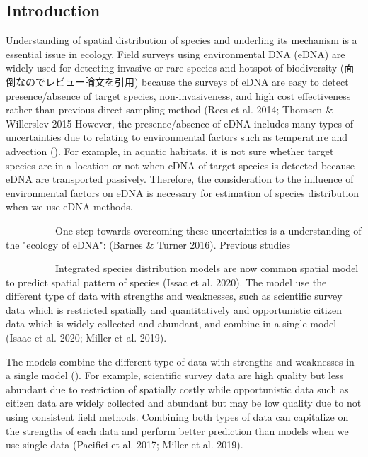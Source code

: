 \documentclass[12pt]{article}
\begin{document}
\newpage
\begin{linenumbers}
\section{Introduction}
Understanding of spatial distribution of species and underling its mechanism is a essential issue in ecology.
Field surveys using environmental DNA (eDNA) are widely used for detecting invasive or rare species and hotspot of biodiversity (面倒なのでレビュー論文を引用) because the surveys of eDNA are easy to detect presence/absence of target species, non-invasiveness, and high cost effectiveness rather than previous direct sampling method (Rees et al. 2014; Thomsen \& Willerslev 2015 %
However, the presence/absence of eDNA includes many types of uncertainties due to relating to environmental factors such as temperature and advection ().
For example, in aquatic habitats, it is not sure whether target species are in a location or not when eDNA of target species is detected because eDNA are transported passively.
Therefore, the consideration to the influence of environmental factors on eDNA is necessary for estimation of species distribution when we use eDNA methods.

\ \ \ \ \ \ \ \ \ \ 
One step towards overcoming these uncertainties is a understanding of the "ecology of eDNA":  (Barnes \& Turner 2016). Previous studies

\ \ \ \ \ \ \ \ \ \ 
Integrated species distribution models are now common spatial model to predict spatial pattern of species (Issac et al. 2020).
The model use the different type of data with strengths and weaknesses, such as scientific survey data which is restricted spatially and quantitatively and opportunistic citizen data which is widely collected and abundant, and combine in a single model (Isaac et al. 2020; Miller et al. 2019).

The models combine the different type of data with strengths and weaknesses in a single model ().
For example, scientific survey data are high quality but less abundant due to restriction of spatially costly while opportunistic data such as citizen data are widely collected and abundant but may be low quality due to not using consistent field methods.
Combining both types of data can capitalize on the strengths of each data and perform better prediction than models when we use single data (Pacifici et al. 2017; Miller et al. 2019).




\end{linenumbers}
\end{document}
